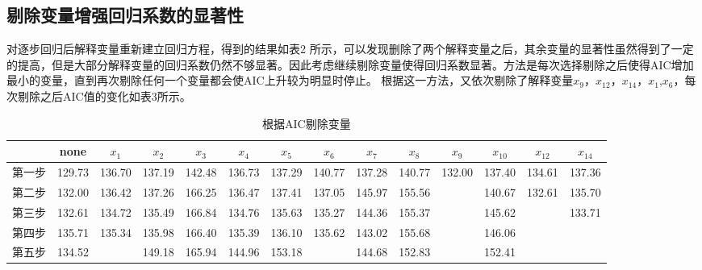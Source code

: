\documentclass [a4paper]{article}
\begin{document}
\subsection{剔除变量增强回归系数的显著性}
对逐步回归后解释变量重新建立回归方程，得到的结果如表2 所示，可以发现删除了两个解释变量之后，其余变量的显著性虽然得到了一定的提高，但是大部分解释变量的回归系数仍然不够显著。因此考虑继续剔除变量使得回归系数显著。方法是每次选择剔除之后使得AIC增加最小的变量，直到再次剔除任何一个变量都会使AIC上升较为明显时停止。
根据这一方法，又依次剔除了解释变量$x_{9}$，$x_{12}$，$x_{14}$，$x_1$,$x_6$，每次剔除之后AIC值的变化如表3所示。
\begin{table}
  \caption{根据AIC剔除变量}
  \label{}
  \tiny
  \centering
  \begin{tabular}{cccccccccccccc}
    \toprule
    &none&$x_1$&$x_2$&$x_3$&$x_4$&$x_5$&$x_6$&$x_7$&$x_8$&$x_9$&$x_{10}$&$x_{12}$&$x_{14}$\\
    \midrule
    第一步&129.73&136.70&137.19&142.48&136.73&137.29&140.77&137.28&140.77&132.00&137.40&134.61&137.36\\
    第二步&132.00&136.42&137.26&166.25&136.47&137.41&137.05&145.97&155.56&&140.67&132.61&135.70\\
    第三步&132.61&134.72&135.49&166.84&134.76&135.63&135.27&144.36&155.37&&145.62&&133.71\\
    第四步&135.71&135.34&135.98&166.40&135.39&136.10&135.62&143.02&155.68&&146.06&&\\
    第五步&134.52&&149.18&165.94&144.96&153.18&&144.68&152.83&&152.41\\

    \bottomrule
  \end{tabular}

\end{table}
\end{document}
